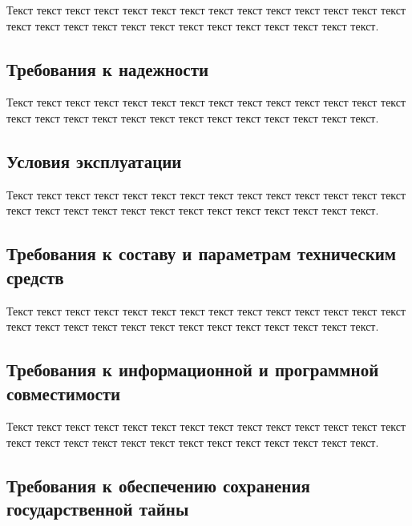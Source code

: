 Текст текст текст текст текст текст текст текст текст текст текст текст текст текст текст текст текст текст текст текст текст текст текст текст текст текст текст.

\subsection{Требования к надежности}\label{section:Требования_к_надежности}

Текст текст текст текст текст текст текст текст текст текст текст текст текст текст текст текст текст текст текст текст текст текст текст текст текст текст текст.	
	
\subsection{Условия эксплуатации}

Текст текст текст текст текст текст текст текст текст текст текст текст текст текст текст текст текст текст текст текст текст текст текст текст текст текст текст.

\subsection{Требования к составу и параметрам техническим средств}

Текст текст текст текст текст текст текст текст текст текст текст текст текст текст текст текст текст текст текст текст текст текст текст текст текст текст текст.

\subsection{Требования к информационной и программной совместимости}

Текст текст текст текст текст текст текст текст текст текст текст текст текст текст текст текст текст текст текст текст текст текст текст текст текст текст текст.

\subsection{Требования к обеспечению сохранения государственной тайны}

